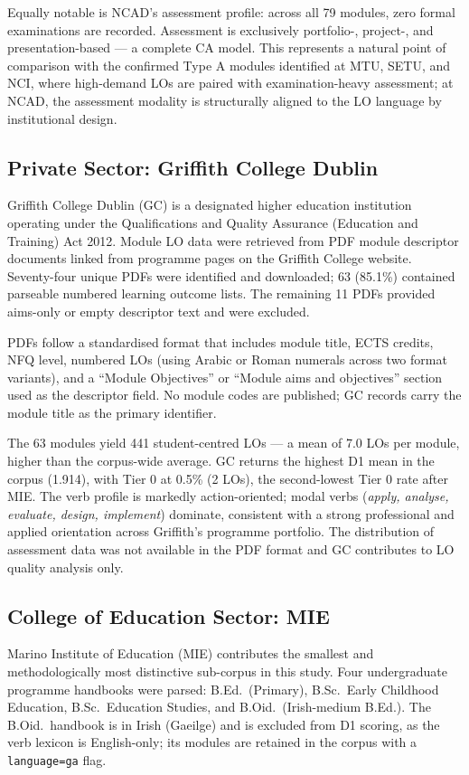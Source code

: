 \documentclass[12pt, a4paper]{article}
\begin{document}
Equally notable is NCAD's assessment profile: across all 79 modules, zero formal
examinations are recorded. Assessment is exclusively portfolio-, project-, and
presentation-based --- a complete CA model. This represents a natural point of
comparison with the confirmed Type A modules identified at MTU, SETU, and NCI,
where high-demand LOs are paired with examination-heavy assessment; at NCAD,
the assessment modality is structurally aligned to the LO language by institutional
design.

\subsection{Private Sector: Griffith College Dublin}

Griffith College Dublin (GC) is a designated higher education institution operating
under the Qualifications and Quality Assurance (Education and Training) Act 2012.
Module LO data were retrieved from PDF module descriptor documents linked from
programme pages on the Griffith College website. Seventy-four unique PDFs were
identified and downloaded; 63 (85.1\%) contained parseable numbered learning
outcome lists. The remaining 11 PDFs provided aims-only or empty descriptor text
and were excluded.

PDFs follow a standardised format that includes module title, ECTS credits, NFQ level,
numbered LOs (using Arabic or Roman numerals across two format variants), and a
``Module Objectives'' or ``Module aims and objectives'' section used as the
descriptor field. No module codes are published; GC records carry the module title
as the primary identifier.

The 63 modules yield 441 student-centred LOs --- a mean of 7.0 LOs per module,
higher than the corpus-wide average. GC returns the highest D1 mean in the corpus
(1.914), with Tier 0 at 0.5\% (2 LOs), the second-lowest Tier 0 rate after MIE.
The verb profile is markedly action-oriented; modal verbs (\textit{apply, analyse,
evaluate, design, implement}) dominate, consistent with a strong professional and
applied orientation across Griffith's programme portfolio. The distribution of
assessment data was not available in the PDF format and GC contributes to LO quality
analysis only.

\subsection{College of Education Sector: MIE}

Marino Institute of Education (MIE) contributes the smallest and methodologically
most distinctive sub-corpus in this study. Four undergraduate programme handbooks
were parsed: B.Ed.\ (Primary), B.Sc.\ Early Childhood Education, B.Sc.\ Education
Studies, and B.Oid.\ (Irish-medium B.Ed.). The B.Oid.\ handbook is in Irish (Gaeilge)
and is excluded from D1 scoring, as the verb lexicon is English-only; its modules
are retained in the corpus with a \texttt{language=ga} flag.
\end{document}
